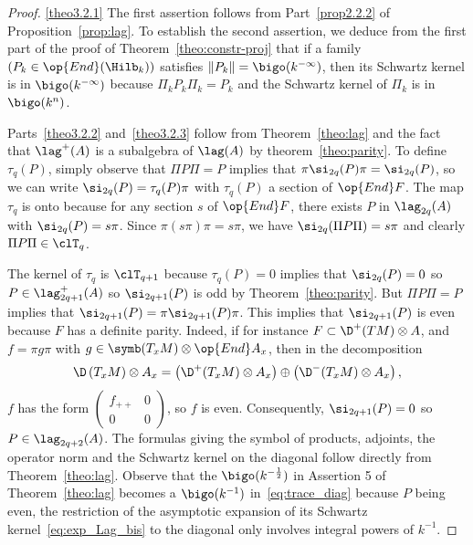 \begin{proof}
\eqref{theo3.2.1} The first assertion follows from Part~\eqref{prop2.2.2} of Proposition~\ref{prop:lag}. To establish the second assertion, we deduce from the first part of the
proof of Theorem~\ref{theo:constr-proj} that if a family $(P_k \in \op{End} (\Hilb_k))$ satisfies $\| P_k \| = \bigo (k^{-\infty})$, then its Schwartz kernel is in $\bigo (k^{-\infty})$ because $ \Pi_k P_k \Pi_k = P_k$ and the Schwartz kernel of $\Pi_k$ is in $\bigo (k^{n})$.

Parts~\eqref{theo3.2.2} and~\eqref{theo3.2.3} follow from Theorem~\ref{theo:lag} and the fact that $\lag ^{+} (A)$ is a subalgebra of $\lag (A)$ by theorem~\ref{theo:parity}. To define $\tau_q (P)$, simply observe that $\Pi P \Pi = P$ implies that $\pi \si_{2q} (P) \pi = \si_{2q}(P)$, so we can write $\si_{2q} (P) = \tau_q(P) \pi$ with $\tau_q (P)$ a section of $ \op{End} F$. The map $\tau_q$ is onto because for any section $s$ of $\op{End} F$, there exists $P$ in $ \lag_{2q} (A)$ with $\si_{2q} (P) = s \pi$. Since $\pi (s \pi) \pi = s
\pi$, we have $\si_{2q} (\Pi P \Pi) = s \pi$ and clearly $\Pi P \Pi \in
\clT_q$.

The kernel of $\tau_q$ is $\clT_{q+1}$ because $\tau_q (P) =0$ implies that $\si_{2q} (P) =0$ so $P \in \lag^{+}_{2q+1} (A)$ so $\si_{2q+1} (P)$ is odd by Theorem~\ref{theo:parity}. But $\Pi P \Pi = P$ implies that $\si_{2q+1} (P) = \pi \si_{2 q+1} (P) \pi$. This implies that $\si_{2q+1} (P)$ is even because $F$ has a definite parity. Indeed, if for instance $F \subset \D^+(TM) \otimes A$, and $f = \pi g \pi$ with $g \in \symb (T_xM) \otimes \op{End} A_x$, then
in the decomposition
\[
\D \left(T_xM\right) \otimes A_x = \left(\D^+ (T_xM) \otimes A_x\right) \oplus \left(\D^{-} (T_xM) \otimes
A_x\right),
\]
$f$ has the form $
(\begin{smallmatrix} f_{++} & 0 \\ 0 & 0
\end{smallmatrix})$, so $f$ is even. Consequently, $\si_{2q+1} (P) = 0$ so $P \in \lag_{2q+2} (A)$. The formulas giving the symbol of products, adjoints, the operator norm and the Schwartz kernel on the diagonal follow directly from Theorem~\ref{theo:lag}.  Observe that the $\bigo (k^{-\frac{1}{2}})$ in Assertion 5 of Theorem~\ref{theo:lag} becomes a $\bigo (k^{-1})$ in~\eqref{eq:trace_diag} because $P$ being even, the restriction of the asymptotic expansion of its Schwartz kernel~\eqref{eq:exp_Lag_bis} to the diagonal only involves integral powers of $k^{-1}$. 
\end{proof}

